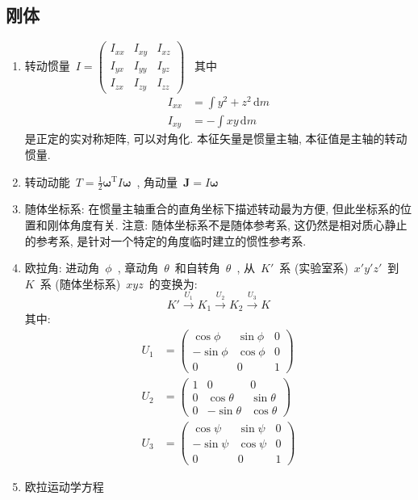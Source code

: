 \documentclass[11pt,a4paper]{article}%
\newcommand{\diff}{\,\mathrm{d}}
\renewcommand{\[}{~$\displaystyle}
\renewcommand{\]}{$~}%
\begin{document}
	\subsection{刚体}
	\begin{enumerate}
	 \item 转动惯量\[I = \begin{pmatrix}
	 I_{xx}&I_{xy}&I_{xz}\\I_{yx}&I_{yy}&I_{yz}\\I_{zx}&I_{zy}&I_{zz}
	 \end{pmatrix}\] 其中
	 \begin{align*}
	  I_{xx} &= \int y^2+z^2 \diff m \\
	  I_{xy} &= -\int xy\diff m
	 \end{align*}
	 是正定的实对称矩阵, 可以对角化. 本征矢量是惯量主轴, 本征值是主轴的转动惯量. 
	 \item 转动动能\[T = \frac 12 \bm\omega^{\mathrm T}I\bm\omega\], 角动量\[\bm J = I\bm \omega\]
	 \item 随体坐标系: 在惯量主轴重合的直角坐标下描述转动最为方便, 但此坐标系的位置和刚体角度有关. 注意: 随体坐标系不是随体参考系, 这仍然是相对质心静止的参考系, 是针对一个特定的角度临时建立的惯性参考系.
	 \item 欧拉角: 进动角\[\phi\], 章动角\[\theta\]和自转角\[\theta\], 从\[K'\]系 (实验室系)\[x'y'z'\]到\[K\]系 (随体坐标系)\[xyz\]的变换为:
	 $$
	  K'\stackrel{U_1}\longrightarrow K_1 \stackrel{U_2}\longrightarrow K_2 \stackrel{U_3}\longrightarrow K
	 $$
	 其中:
	 \begin{align*}
	  U_1 &= \begin{pmatrix}\cos \phi & \sin \phi &0\\-\sin \phi &\cos \phi & 0\\ 0 &0&1\end{pmatrix} \\
	  U_2 &= \begin{pmatrix}1&0&0 \\0 & \cos \theta & \sin \theta \\0 & -\sin \theta &\cos \theta\end{pmatrix} \\
	  U_3 &= \begin{pmatrix}\cos \psi & \sin \psi &0\\-\sin \psi &\cos \psi & 0\\ 0 &0&1\end{pmatrix}
	 \end{align*}
	 \item 欧拉运动学方程
	 \renewcommand{\T}{^{\mathrm T}}

\end{enumerate}
\end{document}
